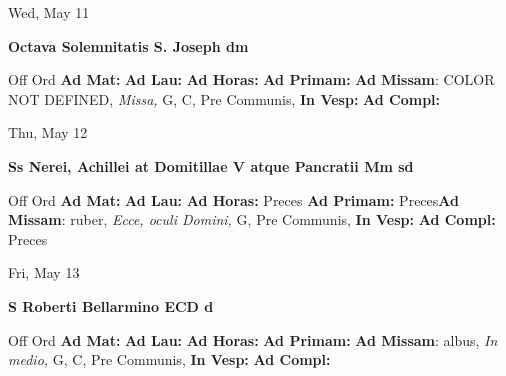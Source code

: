 \documentclass[10pt]{book}
\begin{document}
\begin{center}
\begin{minipage}{3.5in}
\vspace{2em}
\begin{center}Wed, May 11
\end{center}
\textbf{ \large Octava Solemnitatis S. Joseph
\textnormal{\normalsize dm}}

\begin{justify}Off Ord
\textbf{Ad Mat: }
\textbf{Ad Lau: }
\textbf{Ad Horas: }
\textbf{Ad Primam: }\textbf{Ad Missam}: COLOR NOT DEFINED, \textit{Missa,} G, C, Pre Communis, 
\textbf{In Vesp: }
\textbf{Ad Compl: }
\end{justify}
\end{minipage}
\end{center}

\begin{center}
\begin{minipage}{3.5in}
\vspace{2em}
\begin{center}Thu, May 12
\end{center}
\textbf{ \large Ss Nerei, Achillei at Domitillae V atque Pancratii Mm
\textnormal{\normalsize sd}}

\begin{justify}Off Ord
\textbf{Ad Mat: }
\textbf{Ad Lau: }
\textbf{Ad Horas: }Preces
\textbf{Ad Primam: }Preces\textbf{Ad Missam}: ruber, \textit{Ecce, oculi Domini,} G, Pre Communis, 
\textbf{In Vesp: }
\textbf{Ad Compl: }Preces
\end{justify}
\end{minipage}
\end{center}

\begin{center}
\begin{minipage}{3.5in}
\vspace{2em}
\begin{center}Fri, May 13
\end{center}
\textbf{ \large S Roberti Bellarmino ECD
\textnormal{\normalsize d}}

\begin{justify}Off Ord
\textbf{Ad Mat: }
\textbf{Ad Lau: }
\textbf{Ad Horas: }
\textbf{Ad Primam: }\textbf{Ad Missam}: albus, \textit{In medio,} G, C, Pre Communis, 
\textbf{In Vesp: }
\textbf{Ad Compl: }
\end{justify}
\end{minipage}
\end{center}
\end{document}
